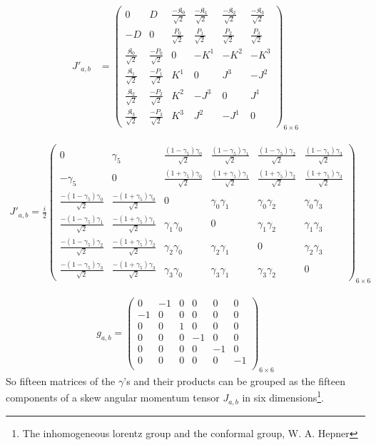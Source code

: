 \begin{align}
  J'_{a,b}&=
  \begin{pmatrix}
  0&D&\frac{-\mathfrak{K}_0}{\sqrt{2}}&\frac{-\mathfrak{K}_1}{\sqrt{2}}&\frac{-\mathfrak{K}_2}{\sqrt{2}}&\frac{-\mathfrak{K}_3}{\sqrt{2}}\\
  -D&0&\frac{P_0}{\sqrt{2}}&\frac{P_1}{\sqrt{2}}&\frac{P_2}{\sqrt{2}}&\frac{P_3}{\sqrt{2}}\\
    \frac{\mathfrak{K}_0}{\sqrt{2}}&\frac{-P_0}{\sqrt{2}}&0 & -K^{1} & -K^{2} & -K^{3}\\
    \frac{\mathfrak{K}_1}{\sqrt{2}}&\frac{-P_1}{\sqrt{2}}&K^{1} & 0 & J^{3} & -J^{2}\\
    \frac{\mathfrak{K}_2}{\sqrt{2}}&\frac{-P_2}{\sqrt{2}}&K^{2} & -J^{3} & 0 & J^{1}\\
    \frac{\mathfrak{K}_3}{\sqrt{2}}&\frac{-P_3}{\sqrt{2}}&K^{3} & J^{2} & -J^{1} & 0
  \end{pmatrix}_{6\times6}
\end{align}

\begin{align}
  \boxed{J'_{a,b}=\frac{i}{2}
  \begin{pmatrix}
  0&\gamma_5&\frac{(1-\gamma_5)\gamma_0}{\sqrt{2}}&\frac{(1-\gamma_5)\gamma_1}{\sqrt{2}}&\frac{(1-\gamma_5)\gamma_2}{\sqrt{2}}&\frac{(1-\gamma_5)\gamma_3}{\sqrt{2}}\\
  -\gamma_5&0&\frac{(1+\gamma_5)\gamma_0}{\sqrt{2}}&\frac{(1+\gamma_5)\gamma_1}{\sqrt{2}}&\frac{(1+\gamma_5)\gamma_2}{\sqrt{2}}&\frac{(1+\gamma_5)\gamma_3}{\sqrt{2}}\\
    \frac{-(1-\gamma_5)\gamma_0}{\sqrt{2}}&\frac{-(1+\gamma_5)\gamma_0}{\sqrt{2}}&0 & \gamma_0\gamma_1 & \gamma_0\gamma_2 & \gamma_0\gamma_3\\
   \frac{-(1-\gamma_5)\gamma_1}{\sqrt{2}}&\frac{-(1+\gamma_5)\gamma_1}{\sqrt{2}}&\gamma_1\gamma_0 & 0 & \gamma_1\gamma_2 & \gamma_1\gamma_3\\
    \frac{-(1-\gamma_5)\gamma_2}{\sqrt{2}}&\frac{-(1+\gamma_5)\gamma_2}{\sqrt{2}}&\gamma_2\gamma_0 & \gamma_2\gamma_1 & 0 & \gamma_2\gamma_3\\
    \frac{-(1-\gamma_5)\gamma_3}{\sqrt{2}}&\frac{-(1+\gamma_5)\gamma_3}{\sqrt{2}}&\gamma_3\gamma_0 & \gamma_3\gamma_1 & \gamma_3\gamma_2 & 0
  \end{pmatrix}_{6\times6}}
\end{align}

  \begin{align}
      g_{a,b}=\begin{pmatrix}
  0&-1&0&0&0&0\\
  -1&0&0&0&0&0\\
  0&0&1&0&0&0\\
  0&0&0&-1&0&0\\
  0&0&0&0&-1&0\\
  0&0&0&0&0&-1\\
  \end{pmatrix}_{6\times6}
  \end{align}
So fifteen matrices of the $\gamma$'s and their products can be grouped as the fifteen components of a skew angular momentum tensor
$J_{a,b}$ in six dimensions\footnote{The inhomogeneous lorentz group and the conformal group,
W. A. Hepner}.

